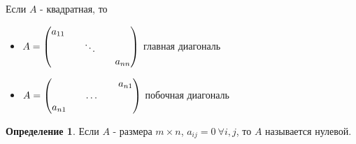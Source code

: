 \documentclass[a4paper, 12pt]{article}
\theoremstyle{definition}
\newtheorem*{definition}{Определение}
\begin{document}
    \newpage

    Если $A$ - квадратная, то
    \begin{itemize}
      \item $ A =\begin{pmatrix}
        a_{11} && \null && \null \\
        \null && \ddots && \null \\
        \null && \null && a_{nn} 
      \end{pmatrix} $ главная диагональ
      \item $ A =
      \begin{pmatrix}
        \null && \null && a_{n1} \\
        \null && \dots && \null \\
        a_{n1}  && \null && \null
      \end{pmatrix} $ побочная диагональ
    \end{itemize}
    
    \begin{definition}
      Если $A$ - размера $m\times n$, $a_{ij} = 0\ \forall i,j$, то $A$ называется нулевой.
    \end{definition}
\end{document}
